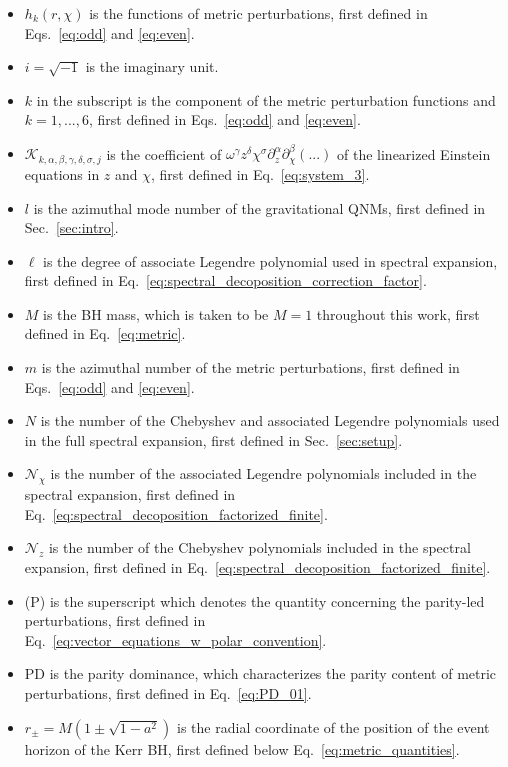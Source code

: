 \documentclass[aps,prx,amsmath,floats,floatfix,twocolumn,
  superscriptaddress,nofootinbib,showpacs]{revtex4-1}
\begin{document}
\begin{itemize}
    \item $h_k(r, \chi)$ is the functions of metric perturbations, first defined in Eqs.~\eqref{eq:odd} and \eqref{eq:even}. 
    \item $i = \sqrt{-1}$ is the imaginary unit. 
    \item $k$ in the subscript is the component of the metric perturbation functions and $k= 1, ..., 6$, first defined in Eqs.~\eqref{eq:odd} and \eqref{eq:even}.
    \item $\mathcal{K}_{k, \alpha, \beta, \gamma, \delta, \sigma, j} $ is the coefficient of $\omega^\gamma z^{\delta} \chi^{\sigma} \partial_{z}^{\alpha} \partial_{\chi}^{\beta}(...)$ of the linearized Einstein equations in $z$ and $\chi$, first defined in Eq.~\eqref{eq:system_3}. 
    \item $l$ is the azimuthal mode number of the gravitational QNMs, first defined in Sec.~\ref{sec:intro}. 
    \item $\ell$ is the degree of associate Legendre polynomial used in spectral expansion, first defined in Eq.~\eqref{eq:spectral_decoposition_correction_factor}.
    \item $M$ is the BH mass, which is taken to be $M=1$ throughout this work, first defined in Eq.~\eqref{eq:metric}. 
    \item $m$ is the azimuthal number of the metric perturbations, first defined in Eqs.~\eqref{eq:odd} and \eqref{eq:even}. 
    \item $N$ is the number of the Chebyshev and associated Legendre polynomials used in the full spectral expansion, first defined in Sec.~\ref{sec:setup}. 
    \item $\mathcal{N}_{\chi}$ is the number of the associated Legendre polynomials included in the spectral expansion, first defined in Eq.~\eqref{eq:spectral_decoposition_factorized_finite}. 
    \item $\mathcal{N}_{z}$ is the number of the Chebyshev polynomials included in the spectral expansion, first defined in Eq.~\eqref{eq:spectral_decoposition_factorized_finite}. 
    \item (P) is the superscript which denotes the quantity concerning the parity-led perturbations, first defined in Eq.~\eqref{eq:vector_equations_w_polar_convention}.
    \item PD is the parity dominance, which characterizes the parity content of metric perturbations, first defined in Eq.~\eqref{eq:PD_01}.
    \item $r_\pm = M(1\pm\sqrt{1-a^2})$ is the radial coordinate of the position of the event horizon of the Kerr BH, first defined below Eq.~\eqref{eq:metric_quantities}. 

\end{itemize}
\end{document}
